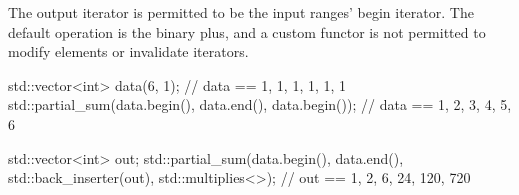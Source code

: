 
The output iterator is permitted to be the input ranges’ begin iterator. The default operation is the binary plus, and a custom functor is not permitted to modify elements or invalidate iterators.

\begin{box-note}
\begin{cppcode}
std::vector<int> data(6, 1);
// data == {1, 1, 1, 1, 1, 1}
std::partial_sum(data.begin(), data.end(), data.begin());
// data == {1, 2, 3, 4, 5, 6}

std::vector<int> out;
std::partial_sum(data.begin(), data.end(), std::back_inserter(out), std::multiplies<>{});
// out == {1, 2, 6, 24, 120, 720}
\end{cppcode}
\end{box-note}
